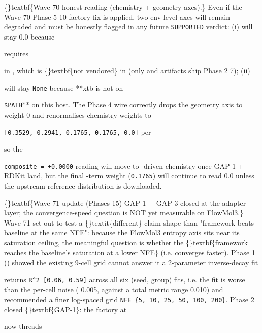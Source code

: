 \documentclass{article}
\begin{document}
\{\}textbf\{Wave 70 honest reading (chemistry + geometry axes).\} Even if the Wave 70 Phase 5 10 factory fix is applied, two env-level axes will remain degraded and must be honestly flagged in any future \texttt{SUPPORTED} verdict: (i)  will stay 0.0 because

 requires

 in , which is \{\}textbf\{not vendored\} in  (only  and  artifacts ship  Phase 2 7); (ii)

 will stay \texttt{None} because **xtb is not on

\texttt{\$PATH}** on this host. The Phase 4 wire correctly drops the geometry axis to weight 0 and renormalises chemistry weights to

\texttt{[0.3529, 0.2941, 0.1765, 0.1765, 0.0]} per

  so the

\texttt{composite = +0.0000} reading will move to -driven chemistry once GAP-1 + RDKit land, but the final -term weight (\texttt{0.1765}) will continue to read 0.0 unless the upstream reference distribution is downloaded.

\{\}textbf\{Wave 71 update (Phases 15)  GAP-1 + GAP-3 closed at the adapter layer; the convergence-speed question is NOT yet measurable on FlowMol3.\} Wave 71 set out to test a \{\}textit\{different\} claim shape than "framework beats baseline at the same NFE": because the FlowMol3 entropy axis sits near its saturation ceiling, the meaningful question is whether the \{\}textbf\{framework reaches the baseline's saturation at a lower NFE\} (i.e. converges faster). Phase 1 () showed the existing 9-cell grid cannot answer it  a 2-parameter inverse-decay fit

 returns \texttt{R\textasciicircum{}2  [0.06, 0.59]} across all six (seed, group) fits, i.e. the fit is worse than the per-cell noise ( 0.005, against a total metric range  0.010)  and recommended a finer log-spaced grid \texttt{NFE  \{5, 10, 25, 50, 100, 200\}}. Phase 2 closed \{\}textbf\{GAP-1\}: the factory at

 now threads
\end{document}
